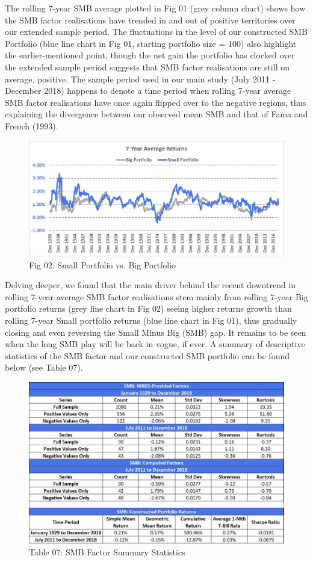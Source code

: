 \documentclass[12pt]{article}
\begin{document}
\noindent The rolling 7-year SMB average plotted in Fig 01 (grey column chart) shows how the SMB factor realisations have trended in and out of positive territories over our extended sample period. The fluctuations in the level of our constructed SMB Portfolio (blue line chart in Fig 01, starting portfolio size = 100) also highlight the earlier-mentioned point, though the net gain the portfolio has clocked over the extended sample period suggests that SMB factor realisations are still on average, positive. The sample period used in our main study (July 2011 - December 2018) happens to denote a time period when rolling 7-year average SMB factor realisations have once again flipped over to the negative regions, thus explaining the divergence between our observed mean SMB and that of Fama and French (1993).

\begin{figure}[h]
	\centering
	\includegraphics[width=0.9\linewidth]{SMB02}
	\caption*{Fig 02: Small Portfolio vs. Big Portfolio}
	\label{fig:label}
\end{figure}

\noindent Delving deeper, we found that the main driver behind the recent downtrend in rolling 7-year average SMB factor realisations stem mainly from rolling 7-year Big portfolio returns (grey line chart in Fig 02) seeing higher returns growth than rolling 7-year Small portfolio returns (blue line chart in Fig 01), thus gradually closing and even reversing the Small Minus Big (SMB) gap.  It remains to be seen when the long SMB play will be back in vogue, if ever. A summary of descriptive statistics of the SMB factor and our constructed SMB portfolio can be found below (see Table 07).

\newpage

\begin{figure}[h]
	\centering
	\includegraphics[width=0.8\linewidth]{SMB03}
	\caption*{Table 07: SMB Factor Summary Statistics}
	\label{fig:label}
\end{figure}
\end{document}
